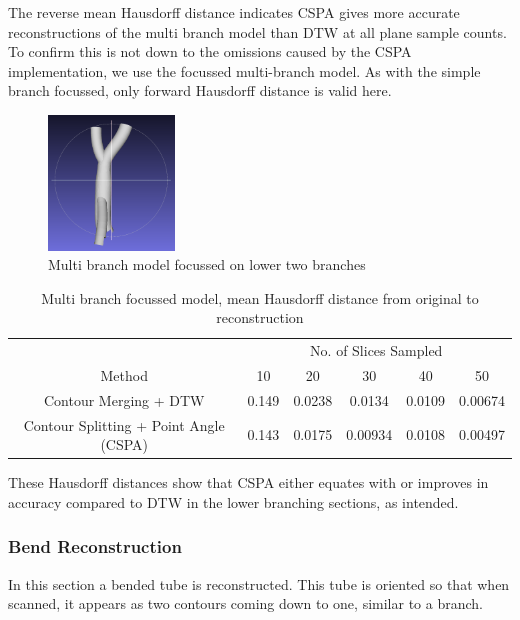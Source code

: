 \documentclass[11p, titlepage]{article}
\begin{document}
The reverse mean Hausdorff distance indicates CSPA gives more accurate reconstructions of the multi branch model than DTW at all plane sample counts. To confirm this is not down to the omissions caused by the CSPA implementation, we use the focussed multi-branch model. As with the simple branch focussed, only forward Hausdorff distance is valid here.

\begin{figure}[h!]
\centering
\includegraphics[width=0.3\textwidth]{originals/multi-branch-2-7}
\caption{Multi branch model focussed on lower two branches\label{fig:multi_branch_focussed}}
\end{figure}

\begin{table}[h!]
\begin{tabular}{ | c | c | c | c | c | c | }
\hline
& \multicolumn{5}{c|}{No. of Slices Sampled} \\
\cline{2-6}
Method & 10 & 20 & 30 & 40 & 50 \\
\hline
Contour Merging + DTW & 0.149 & 0.0238 & 0.0134 & 0.0109 & 0.00674 \\
Contour Splitting + Point Angle (CSPA) & 0.143 & 0.0175 & 0.00934 & 0.0108 & 0.00497 \\
\hline
\end{tabular}
\caption{Multi branch focussed model, mean Hausdorff distance from original to reconstruction}
\label{table:multi_branch_focussed_forward}
\end{table}
\FloatBarrier

These Hausdorff distances show that CSPA either equates with or improves in accuracy compared to DTW in the lower branching sections, as intended.
\pagebreak

\subsubsection{Bend Reconstruction}

In this section a bended tube is reconstructed. This tube is oriented so that when scanned, it appears as two contours coming down to one, similar to a branch.
\end{document}
